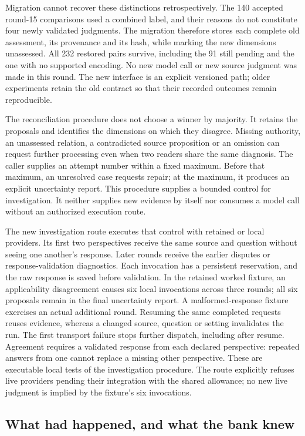 \documentclass[12pt,a4paper,oneside,openany]{book}
\begin{document}
Migration cannot recover these distinctions retrospectively. The 140 accepted
round-15 comparisons used a combined label, and their reasons do not constitute
four newly validated judgments. The migration therefore stores each complete
old assessment, its provenance and its hash, while marking the new dimensions
unassessed. All 232 restored pairs survive, including the 91 still pending and
the one with no supported encoding. No new model call or new source judgment
was made in this round. The new interface is an explicit versioned path; older
experiments retain the old contract so that their recorded outcomes remain
reproducible.

The reconciliation procedure does not choose a winner by majority. It retains
the proposals and identifies the dimensions on which they disagree. Missing
authority, an unassessed relation, a contradicted source proposition or an
omission can request further processing even when two readers share the same
diagnosis. The caller supplies an attempt number within a fixed maximum. Before
that maximum, an unresolved case requests repair; at the maximum, it produces
an explicit uncertainty report. This procedure supplies a bounded control for
investigation. It neither supplies new evidence by itself nor consumes a model
call without an authorized execution route.

The new investigation route executes that control with retained or local
providers. Its first two perspectives receive the same source and question
without seeing one another's response. Later rounds receive the earlier
disputes or response-validation diagnostics. Each invocation has a persistent
reservation, and the raw response is saved before validation. In the retained
worked fixture, an applicability disagreement causes six local invocations
across three rounds; all six proposals remain in the final uncertainty report.
A malformed-response fixture exercises an actual additional round. Resuming
the same completed requests reuses evidence, whereas a changed source, question
or setting invalidates the run. The first transport failure stops further
dispatch, including after resume. Agreement requires a validated response from
each declared perspective: repeated answers from one cannot replace a missing
other perspective. These are executable local tests of the
investigation procedure. The route explicitly refuses live providers pending
their integration with the shared allowance; no new live judgment is implied
by the fixture's six invocations.

\subsection{What had happened, and what the bank knew}
\end{document}
